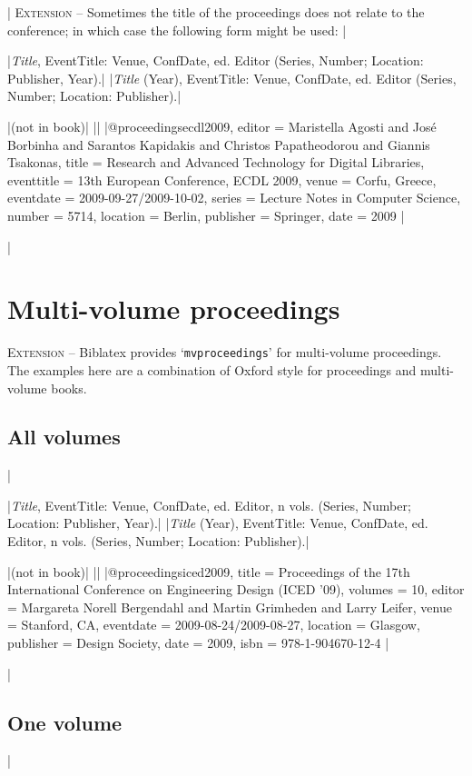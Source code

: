 \documentclass[extrafontsizes,11pt,a4paper,oneside]{memoir}
\newcommand*{\lit}[1]{\textsf{#1}}
\newcommand*{\code}[1]{`\texttt{#1}'}
\begin{document}
\todoc|
\textsc{Extension} – Sometimes the title of the proceedings does not relate to the conference; in which case the following form might be used:
|

\specs
|\emph{Title}, EventTitle: Venue, ConfDate, \lit{ed.} Editor (Series, Number; Location: Publisher, Year).|%
|\emph{Title} (Year), EventTitle: Venue, ConfDate, \lit{ed.} Editor (Series, Number; Location: Publisher).|

\bibexample
|(not in book)|%
||%
|@proceedings{ecdl2009,
  editor = {Maristella Agosti and José Borbinha and Sarantos Kapidakis and Christos Papatheodorou and Giannis Tsakonas},
  title = {Research and Advanced Technology for Digital Libraries},
  eventtitle = {13th European Conference, ECDL 2009},
  venue = {Corfu, Greece},
  eventdate = {2009-09-27/2009-10-02},
  series = {Lecture Notes in Computer Science},
  number = {5714},
  location = {Berlin},
  publisher = {Springer},
  date = {2009}
}|

\todoc|
\section{Multi-volume proceedings}

\textsc{Extension} – Biblatex provides \code{mvproceedings} for multi-volume proceedings.
The examples here are a combination of Oxford style for proceedings and multi-volume books.

\subsection{All volumes}
|

\specs
|\emph{Title}, EventTitle: Venue, ConfDate, \lit{ed.} Editor, n \lit{vols.} (Series, Number; Location: Publisher, Year).|%
|\emph{Title} (Year), EventTitle: Venue, ConfDate, \lit{ed.} Editor, n \lit{vols.} (Series, Number; Location: Publisher).|

\bibexample
|(not in book)|%
||%
|@proceedings{iced2009,
  title = {Proceedings of the 17th International Conference on Engineering Design (ICED ’09)},
  volumes = {10},
  editor = {Margareta Norell Bergendahl and Martin Grimheden and Larry Leifer},
  venue = {Stanford, CA},
  eventdate = {2009-08-24/2009-08-27},
  location = {Glasgow},
  publisher = {Design Society},
  date = {2009},
  isbn = {978-1-904670-12-4}
}|

\todoc|
\subsection{One volume}
|
\end{document}
